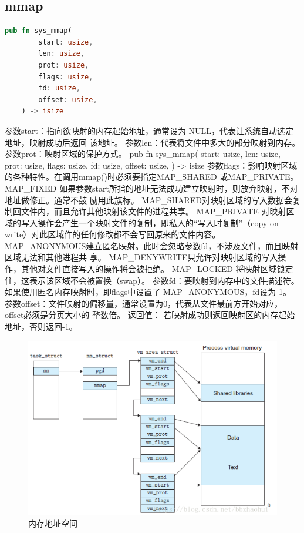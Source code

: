 \subsection{mmap}
\begin{lstlisting}[language=rust]
    pub fn sys_mmap(
        start: usize,
        len: usize,
        prot: usize,
        flags: usize,
        fd: usize,
        offset: usize,
    ) -> isize
\end{lstlisting}
参数start：指向欲映射的内存起始地址，通常设为 NULL，代表让系统自动选定地址，映射成功后返回
该地址。
参数len：代表将文件中多大的部分映射到内存。
参数prot：映射区域的保护方式。
pub fn sys_mmap(
start: usize,
len: usize,
prot: usize,
flags: usize,
fd: usize,
offset: usize,
) -> isize
参数flags：影响映射区域的各种特性。在调用mmap()时必须要指定MAP_SHARED 或MAP_PRIVATE。
MAP_FIXED 如果参数start所指的地址无法成功建立映射时，则放弃映射，不对地址做修正。通常不鼓
励用此旗标。
MAP_SHARED对映射区域的写入数据会复制回文件内，而且允许其他映射该文件的进程共享。
MAP_PRIVATE 对映射区域的写入操作会产生一个映射文件的复制，即私人的“写入时复制”（copy on
write）对此区域作的任何修改都不会写回原来的文件内容。
MAP_ANONYMOUS建立匿名映射。此时会忽略参数fd，不涉及文件，而且映射区域无法和其他进程共
享。
MAP_DENYWRITE只允许对映射区域的写入操作，其他对文件直接写入的操作将会被拒绝。
MAP_LOCKED 将映射区域锁定住，这表示该区域不会被置换（swap）。
参数fd：要映射到内存中的文件描述符。如果使用匿名内存映射时，即flags中设置了
MAP_ANONYMOUS，fd设为-1。
参数offset：文件映射的偏移量，通常设置为0，代表从文件最前方开始对应，offset必须是分页大小的
整数倍。
返回值：
若映射成功则返回映射区的内存起始地址，否则返回-1。
\begin{figure}[htb]
    \centering
    \includegraphics[width=\textwidth]{figures/04-04-内存地址空间.png}
    \caption{
        内存地址空间
    }
    \label{fig:内存地址空间}
\end{figure}

